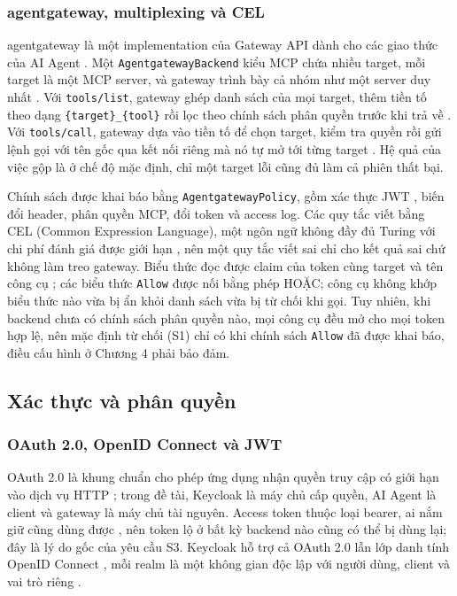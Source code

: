 \subsubsection{agentgateway, multiplexing và CEL}

agentgateway là một implementation của Gateway API dành cho các giao thức của AI Agent \parencite{agentgateway}. Một \texttt{AgentgatewayBackend} kiểu MCP chứa nhiều target, mỗi target là một MCP server, và gateway trình bày cả nhóm như một server duy nhất \parencite{agw_virtual}. Với \texttt{tools/list}, gateway ghép danh sách của mọi target, thêm tiền tố theo dạng \texttt{\{target\}\_\{tool\}} rồi lọc theo chính sách phân quyền trước khi trả về \parencite{agw_toolaccess}. Với \texttt{tools/call}, gateway dựa vào tiền tố để chọn target, kiểm tra quyền rồi gửi lệnh gọi với tên gốc qua kết nối riêng mà nó tự mở tới từng target \parencite{agw_session}. Hệ quả của việc gộp là ở chế độ mặc định, chỉ một target lỗi cũng đủ làm cả phiên thất bại.

Chính sách được khai báo bằng \texttt{AgentgatewayPolicy}, gồm xác thực JWT \parencite{agw_jwt}, biến đổi header, phân quyền MCP, đổi token \parencite{agw_tokenexchange} và access log. Các quy tắc viết bằng CEL (Common Expression Language), một ngôn ngữ không đầy đủ Turing với chi phí đánh giá được giới hạn \parencite{cel_spec}, nên một quy tắc viết sai chỉ cho kết quả sai chứ không làm treo gateway. Biểu thức đọc được claim của token cùng target và tên công cụ \parencite{agw_cel}; các biểu thức \texttt{Allow} được nối bằng phép HOẶC; công cụ không khớp biểu thức nào vừa bị ẩn khỏi danh sách vừa bị từ chối khi gọi. Tuy nhiên, khi backend chưa có chính sách phân quyền nào, mọi công cụ đều mở cho mọi token hợp lệ, nên mặc định từ chối (S1) chỉ có khi chính sách \texttt{Allow} đã được khai báo, điều cấu hình ở Chương 4 phải bảo đảm.

\subsection{Xác thực và phân quyền}

\subsubsection{OAuth 2.0, OpenID Connect và JWT}

OAuth 2.0 là khung chuẩn cho phép ứng dụng nhận quyền truy cập có giới hạn vào dịch vụ HTTP \parencite{rfc6749}; trong đề tài, Keycloak là máy chủ cấp quyền, AI Agent là client và gateway là máy chủ tài nguyên. Access token thuộc loại bearer, ai nắm giữ cũng dùng được \parencite{rfc6750}, nên token lộ ở bất kỳ backend nào cũng có thể bị dùng lại; đây là lý do gốc của yêu cầu S3. Keycloak hỗ trợ cả OAuth 2.0 lẫn lớp danh tính OpenID Connect \parencite{oidc_core}, mỗi realm là một không gian độc lập với người dùng, client và vai trò riêng \parencite{keycloak}.

